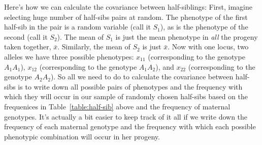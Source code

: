\documentclass[12pt]{article}
\begin{document}
Here's how we can calculate the covariance between half-siblings:
First, imagine selecting huge number of half-sibs pairs at random.
The phenotype of the first half-sib in the pair is a random variable
(call it $S_1$), as is the phenotype of the second (call it $S_2$).
The mean of $S_1$ is just the mean phenotype in {\it all\/} the
progeny taken together, $\bar x$.  Similarly, the mean of $S_2$ is
just $\bar x$.  Now with one locus, two alleles we have three possible
phenotypes: $x_{11}$ (corresponding to the genotype $A_1A_1$),
$x_{12}$ (corresponding to the genotype $A_1A_2$), and $x_{22}$
(corresponding to the genotype $A_2A_2$).  So all we need to do to
calculate the covariance between half-sibs is to write down all
possible pairs of phenotypes and the frequency with which they will
occur in our sample of randomly chosen half-sibs based on the
frequenices in Table~\ref{table:half-sib} above and the frequency of
maternal genotypes.  It's actually a bit easier to keep track of it
all if we write down the frequency of each maternal genotype and the
frequency with which each possible phenotypic combination will occur
in her progeny.
\end{document}
